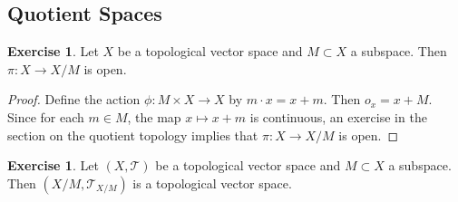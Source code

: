 \documentclass[12pt]{amsart}
\theoremstyle{definition}
\newtheorem{ex}[definition]{Exercise}
\newcommand{\MT}{\mathcal{T}}
\DeclareMathOperator*{\0}{\mbf{0}}
\DeclareMathOperator*{\1}{\mbf{1}}
\begin{document}
	























	\newpage
	\subsection{Quotient Spaces}
	
	\begin{ex}
		Let $X$ be a topological vector space and $M \subset X$ a subspace. Then $\pi: X \rightarrow X / M$ is open. 
	\end{ex}

	\begin{proof}
		Define the action $\phi: M \times X \rightarrow X$ by $m \cdot x = x + m$. Then $o_x = x+ M$. Since for each $m \in M$, the map $x \mapsto x +m$ is continuous, an exercise in the section on the quotient topology implies that $\pi: X \rightarrow X/M$ is open.  
	\end{proof}
	
	\begin{ex}
		Let $(X, \MT)$ be a topological vector space and $M \subset X$ a subspace. Then $(X/M, \MT_{X/M})$ is a topological vector space.
	\end{ex}
\end{document}
